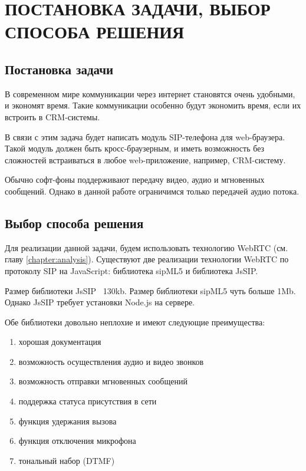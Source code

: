 \chapter{ПОСТАНОВКА ЗАДАЧИ, ВЫБОР СПОСОБА РЕШЕНИЯ}

\section{Постановка задачи}

В современном мире коммуникации через интернет становятся очень удобными, и экономят время. Такие коммуникации особенно будут экономить время, если их встроить в CRM-системы.

В связи с этим задача будет написать модуль SIP-телефона для web-браузера. Такой модуль должен быть кросс-браузерным, и иметь возможность без сложностей встраиваться в любое web-приложение, например, CRM-систему.

Обычно софт-фоны поддерживают передачу видео, аудио и мгновенных сообщений. Однако в данной работе ограничимся только передачей аудио потока.

\section{Выбор способа решения}

Для реализации данной задачи, будем использовать технологию WebRTC (см. главу \ref{chapter:analysis}). Существуют две реализации технологии WebRTC по протоколу SIP на JavaScript: библиотека sipML5 и библиотека JsSIP.\cite{sipML5}\cite{JsSIP}

Размер библиотеки JsSIP ~130kb. Размер библиотеки sipML5 чуть больше 1Mb. Однако JsSIP требует установки Node.js на сервере.

Обе библиотеки довольно неплохие и имеют следующие преимущества:
\begin{enumerate}
\item хорошая документация
\item возможность осуществления аудио и видео звонков
\item возможность отправки мгновенных сообщений
\item поддержка статуса присутствия в сети
\item функция удержания вызова
\item функция отключения микрофона
\item тональный набор (DTMF)
\end{enumerate}

